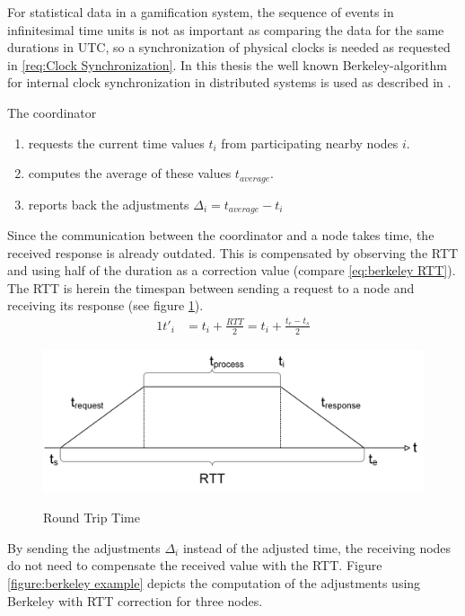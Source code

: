 		For statistical data in a gamification system, the sequence of events in infinitesimal time units is not as important as comparing the data for the same durations in \gls{UTC}, so a synchronization of physical clocks is needed as requested in \ref{req:Clock Synchronization}. In this thesis  the well known Berkeley-algorithm for internal clock synchronization in distributed systems is used as described in \textcite{Ghosh2015}.
		
		\noindent The coordinator
		\begin{enumerate}
			\item requests the current time values $t_i$ from participating nearby nodes $i$.
			\item computes the average of these values $t_{average}$.
			\item reports back the adjustments $\Delta_{i}=t_{average}-t_i$
		\end{enumerate}
	
		Since the communication between the coordinator and a node takes time, the received response is already outdated. This is compensated by observing the \gls{RTT} and using half of the duration as a correction value (compare \ref{eq:berkeley RTT}). The \gls{RTT} is herein the timespan between sending a request to a node and receiving its response (see figure \ref{figure:berkeley RTT}).
		\begin{alignat}{1}
		t'_i &=t_i+\frac{RTT}{2}=t_i+\frac{t_e-t_s}{2} \label{eq:berkeley RTT}
		\end{alignat}
		
		\begin{figure}[!htbp] %
			\caption{Round Trip Time}
			\includegraphics[scale=1.0]{figures/berkeley.png}
			\label{figure:berkeley RTT}
		\end{figure}
		
		 By sending the adjustments $\Delta_i$ instead of the adjusted time, the receiving nodes do not need to compensate the received value with the \gls{RTT}. Figure \ref{figure:berkeley example} depicts the computation of the adjustments using Berkeley with \gls{RTT} correction for three nodes. 
		
